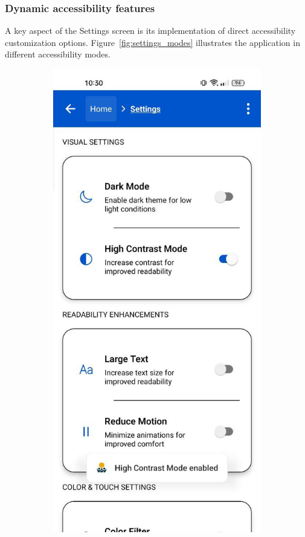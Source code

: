 \subsubsection{Dynamic accessibility features}

A key aspect of the Settings screen is its implementation of direct accessibility customization options. Figure~\ref{fig:settings_modes} illustrates the application in different accessibility modes.

\begin{figure}[ht]
    \centering
    \begin{subfigure}[b]{0.48\textwidth}
        \centering
        \includegraphics[width=\linewidth, alt={Settings screen with dark mode enabled}]{img/settings1.jpg}

\end{subfigure}
\end{figure}

